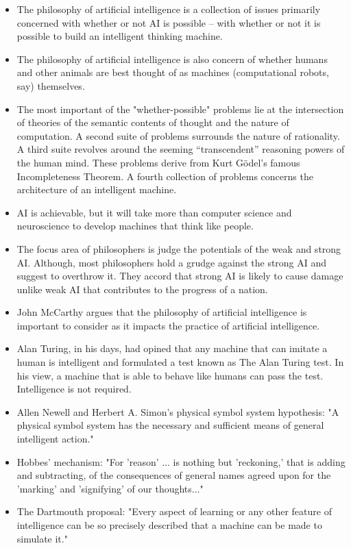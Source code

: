 \documentclass[12pt]{article}
\begin{document}
\begin{itemize}

\item The philosophy of artificial intelligence is a collection of issues primarily concerned with whether or not AI is possible -- with whether or not it is possible to build an intelligent thinking machine.
\item The philosophy of artificial intelligence is also concern of whether humans and other animals are best thought of as machines (computational robots, say) themselves.
\item The most important of the "whether-possible" problems lie at the intersection of theories of the semantic contents of thought and the nature of computation. A second suite of problems surrounds the nature of rationality. A third suite revolves around the seeming “transcendent” reasoning powers of the human mind. These problems derive from Kurt Gödel's famous Incompleteness Theorem. A fourth collection of problems concerns the architecture of an intelligent machine. 
\item AI is achievable, but it will take more than computer science and neuroscience to develop machines that think like people.
\item The focus area of philosophers is judge the potentials of the weak and strong AI. Although, most philosophers hold a grudge against the strong AI and suggest to overthrow it. They accord that strong AI is likely to cause damage unlike weak AI that contributes to the progress of a nation.
\item John McCarthy argues that the philosophy of artificial intelligence is important to consider as it impacts the practice of artificial intelligence.
\item Alan Turing, in his days, had opined that any machine that can imitate a human is intelligent and formulated a test known as The Alan Turing test. In his view, a machine that is able to behave like humans can pass the test. Intelligence is not required.
\item Allen Newell and Herbert A. Simon's physical symbol system hypothesis: "A physical symbol system has the necessary and sufficient means of general intelligent action."
\item Hobbes' mechanism: "For 'reason' ... is nothing but 'reckoning,' that is adding and subtracting, of the consequences of general names agreed upon for the 'marking' and 'signifying' of our thoughts..."
\item The Dartmouth proposal: "Every aspect of learning or any other feature of intelligence can be so precisely described that a machine can be made to simulate it."

\end{itemize}
\end{document}
